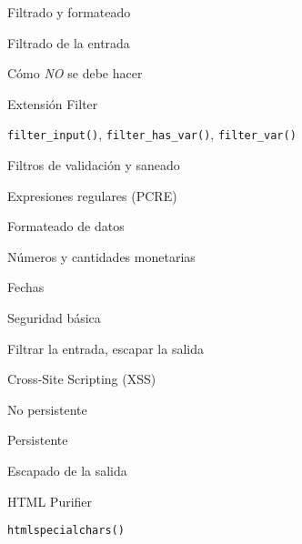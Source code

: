 \begin{longenum}
\begin{longenum}
\begin{longenum}
            \item Filtrado y formateado
            \begin{longenum}
                \item Filtrado de la entrada
                \begin{longenum}
                    \item Cómo \textit{NO} se debe hacer
                    \item Extensión Filter
                    \begin{longenum}
                        \item \texttt{filter\_input()}, \texttt{filter\_has\_var()}, \texttt{filter\_var()}
                        \item Filtros de validación y saneado
                    \end{longenum}
                    \item Expresiones regulares (PCRE)
                \end{longenum}
                \item Formateado de datos
                \begin{longenum}
                    \item Números y cantidades monetarias
                    \item Fechas
                \end{longenum}
            \end{longenum}
            \item Seguridad básica
            \begin{longenum}
                \item Filtrar la entrada, escapar la salida
                \item Cross-Site Scripting (XSS)
                \begin{longenum}
                    \item No persistente
                    \item Persistente
                    \item Escapado de la salida
                    \begin{longenum}
                        \item HTML Purifier
                    \end{longenum}
                \end{longenum}
                \item \texttt{htmlspecialchars()}
            \end{longenum}

\end{longenum}
\end{longenum}
\end{longenum}
